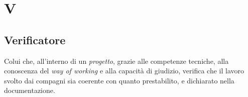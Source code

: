 \chapter{V}

\section{Verificatore}
Colui che, all'interno di un \emph{progetto}, grazie alle competenze tecniche, alla conoscenza del \emph{way of working} e alla capacità di giudizio, verifica che il lavoro svolto dai compagni sia coerente con quanto prestabilito, e dichiarato nella documentazione.